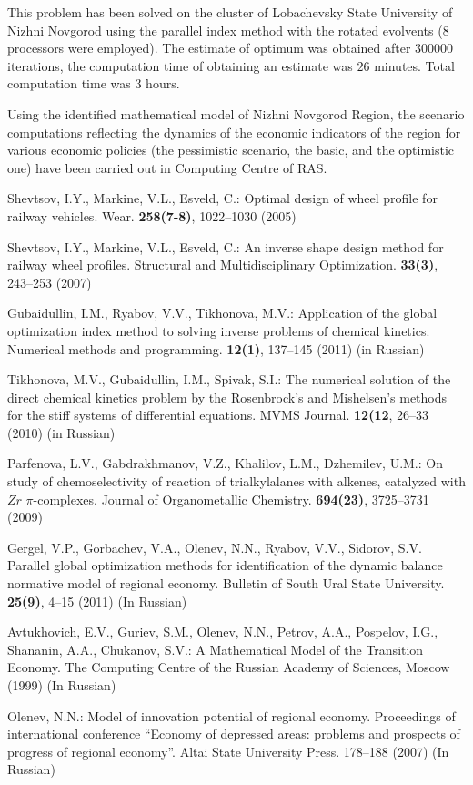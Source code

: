 This problem has been solved on the cluster of Lobachevsky State University of Nizhni Novgorod using the parallel index method with the rotated evolvents (8 processors were employed). The estimate of optimum was obtained after $300 000$ iterations, the computation time of obtaining an estimate was $26$ minutes. Total computation time was $3$ hours.

Using the identified mathematical model of Nizhni Novgorod Region, the scenario computations reflecting the dynamics of the economic indicators of the region for various economic policies (the pessimistic scenario, the basic, and the optimistic one) have been carried out in Computing Centre of RAS.

\begin{thebibliography}{99.}

Shevtsov, I.Y., Markine, V.L., Esveld, C.: Optimal design of wheel profile for railway vehicles. Wear. \textbf{258(7-8)}, 1022--1030 (2005)

Shevtsov, I.Y., Markine, V.L., Esveld, C.: An inverse shape design method for railway wheel profiles. Structural and Multidisciplinary Optimization. \textbf{33(3)}, 243--253 (2007)

Gubaidullin, I.M., Ryabov, V.V., Tikhonova, M.V.: Application of the global optimization index method to solving inverse problems of chemical kinetics. Numerical methods and programming. \textbf{12(1)}, 137--145 (2011) (in Russian)

Tikhonova, M.V., Gubaidullin, I.M., Spivak, S.I.: The numerical solution of the direct chemical kinetics problem by the Rosenbrock's and Mishelsen's methods for the stiff systems of differential equations. MVMS Journal. \textbf{12(12}, 26--33 (2010) (in Russian)

Parfenova, L.V., Gabdrakhmanov, V.Z., Khalilov, L.M., Dzhemilev, U.M.: On study of chemoselectivity of reaction of trialkylalanes with alkenes, catalyzed with $Zr$ $\pi$-complexes. Journal of Organometallic Chemistry. \textbf{694(23)}, 3725--3731 (2009)

Gergel, V.P., Gorbachev, V.A., Olenev, N.N., Ryabov, V.V., Sidorov, S.V. Parallel global optimization methods for identification of the dynamic balance normative model of regional economy. Bulletin of South Ural State University. \textbf{25(9)}, 4--15 (2011) (In Russian)

Avtukhovich, E.V., Guriev, S.M., Olenev, N.N., Petrov, A.A., Pospelov, I.G., Shananin, A.A., Chukanov, S.V.: A Mathematical Model of the Transition Economy. The Computing Centre of the Russian Academy of Sciences, Moscow (1999) (In Russian)

Olenev, N.N.: Model of innovation potential of regional economy. Proceedings of international conference ``Economy of depressed areas: problems and prospects of progress of regional economy''. Altai State University Press. 178--188 (2007) (In Russian)




\end{thebibliography}

%
